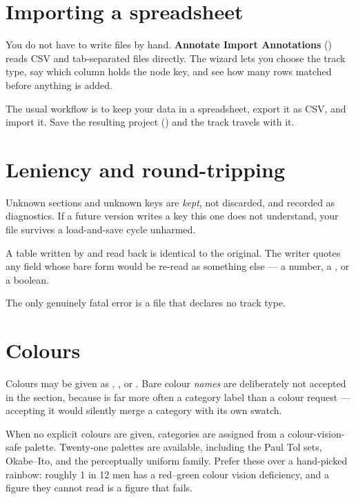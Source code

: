 \section{Importing a spreadsheet}

You do not have to write  files by hand. \textbf{Annotate
\textbf{\textrightarrow} Import Annotations} () reads CSV and
tab-separated files directly. The wizard lets you choose the track type, say which
column holds the node key, and see how many rows matched before anything is
added.

The usual workflow is to keep your data in a spreadsheet, export it as CSV, and
import it. Save the resulting project () and the track travels with
it.

\section{Leniency and round-tripping}

Unknown sections and unknown keys are \emph{kept}, not discarded, and recorded as
diagnostics. If a future version writes a key this one does not understand, your
file survives a load-and-save cycle unharmed.

A table written by \app{} and read back is identical to the original. The writer
quotes any field whose bare form would be re-read as something else --- a number,
a \cmd{-}, or a boolean.

The only genuinely fatal error is a file that declares no track type.

\section{Colours}

Colours may be given as , ,  or
. Bare colour \emph{names} are deliberately not accepted in the
\cmd{[colors]} section, because  is far more often a category label than
a colour request --- accepting it would silently merge a category with its own
swatch.

When no explicit colours are given, categories are assigned from a
colour-vision-safe palette. Twenty-one palettes are available, including the
Paul Tol sets, Okabe--Ito, and the perceptually uniform  family.
Prefer these over a hand-picked rainbow: roughly 1 in 12 men has a red--green
colour vision deficiency, and a figure they cannot read is a figure that fails.
